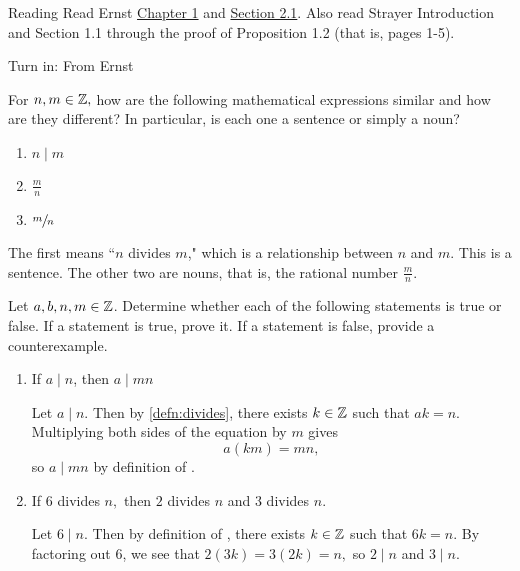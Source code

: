 \documentclass{../ximera}
\begin{document}
  
\begin{pre}
  \item[Reading]  Read Ernst  \href{https://danaernst.com/IBL-IntroToProof/pretext/chap_intro.html}{Chapter 1} and \href{https://danaernst.com/IBL-IntroToProof/pretext/sec_baby_number_theory.html}{Section 2.1}. Also read Strayer Introduction and Section 1.1 through the proof of Proposition 1.2 (that is, pages 1-5).

 \item[Turn in:] From Ernst
  \begin{problem}[Problem 2.6]
    For $n,m\in\mathbb Z,$ how are the following mathematical expressions similar and how are they different? In particular, is each one a sentence or simply a noun?
 
      \begin{enumerate}%
        \item  $n\mid m$
        \item $\frac{m}{n}$ 
        \item $\sfrac{m}{n}$ 
      \end{enumerate}

      \begin{solution}
        The first means ``$n$ divides $m$," which is a relationship between $n$ and $m$. This is a sentence. The other two are nouns, that is, the rational number $\frac{m}{n}$.
      \end{solution}
    \end{problem}
    
    \begin{problem}[Problem 2.8] Let $a,b,n,m\in\mathbb Z$.
        Determine whether each of the following statements is true or false. If a statement is true, prove it. If a statement is false, provide a counterexample.
          \begin{enumerate}%
            \item  If $a\mid n$, then $a\mid mn$
              \begin{solution}
                Let $a\mid n$. Then by \autoref{defn:divides}, there exists $k\in\mathbb Z$ such that $ak=n$. Multiplying both sides of the equation by $m$ gives \[a(km)=mn,\] so $a\mid mn$ by definition of .
              \end{solution}
            
            \item If $6$ divides $n,$ then $2$ divides $n$ and $3$ divides $n$.
              \begin{solution}
                Let $6\mid n$. Then by definition of , there exists $k\in\mathbb Z$ such that $6k=n$. By factoring out $6$, we see that $2(3k)=3(2k)=n,$ so $2\mid n$ and $3\mid n$. 
              \end{solution}


\end{enumerate}
\end{problem}
\end{pre}
\end{document}
